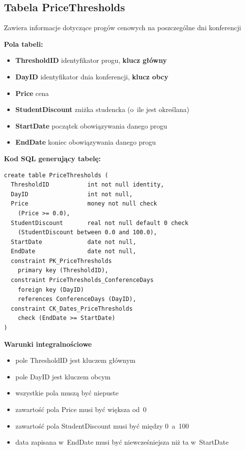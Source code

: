 \documentclass[12pt, a4paper]{mwrep}
\begin{document}
\subsection{Tabela PriceThresholds}

\noindent Zawiera informacje dotyczące progów cenowych na poszczególne dni konferencji

\vspace{0.5cm}

\noindent \textbf{Pola tabeli:}
\begin{itemize}
  \item \textbf{ThresholdID} \ppauza identyfikator progu, \textbf{klucz główny}
  \item \textbf{DayID} \ppauza identyfikator dnia konferencji, \textbf{klucz obcy}
  \item \textbf{Price} \ppauza cena
  \item \textbf{StudentDiscount} \ppauza zniżka studencka (o~ile jest określana)
  \item \textbf{StartDate} \ppauza początek obowiązywania danego progu
  \item \textbf{EndDate} \ppauza koniec obowiązywania danego progu
\end{itemize}

\vspace{0.5cm}
\noindent \textbf{Kod SQL generujący tabelę:}

\begin{lstlisting}
create table PriceThresholds (
  ThresholdID           int not null identity,
  DayID                 int not null,
  Price                 money not null check
    (Price >= 0.0),
  StudentDiscount       real not null default 0 check
    (StudentDiscount between 0.0 and 100.0),
  StartDate             date not null,
  EndDate               date not null,
  constraint PK_PriceThresholds 
    primary key (ThresholdID),
  constraint PriceThresholds_ConferenceDays 
    foreign key (DayID) 
    references ConferenceDays (DayID),
  constraint CK_Dates_PriceThresholds 
    check (EndDate >= StartDate)
)
\end{lstlisting}

\vspace{0.5cm}
\noindent \textbf{Warunki integralnościowe}
\begin{itemize}
  \item pole ThresholdID jest kluczem głównym
  \item pole DayID jest kluczem obcym
  \item wszystkie pola muszą być niepuste
  \item zawartość pola Price musi być większa od~0
  \item zawartość pola StudentDiscount musi być między 0~a~100
  \item data zapisana w~EndDate musi być niewcześniejsza niż ta w~StartDate
\end{itemize}
\end{document}
